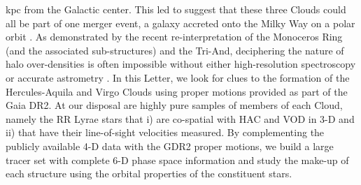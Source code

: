 \documentclass[fleqn,usenatbib]{mnras}
\begin{document}
kpc from the Galactic center. This led \citet{Li2016} to suggest that
these three Clouds could all be part of one merger event, a galaxy
accreted onto the Milky Way on a polar orbit \citep[see
  also][]{Juric2008}.
As demonstrated by the recent re-interpretation of the Monoceros Ring
(and the associated sub-structures) and the Tri-And, deciphering the
nature of halo over-densities is often impossible without either
high-resolution spectroscopy \citep[e.g.][]{Bergemann2018} or accurate
astrometry \citep[e.g.][]{deBoer2018,Deason2018}. In this Letter, we
look for clues to the formation of the Hercules-Aquila and Virgo
Clouds using proper motions provided as part of the Gaia DR2. At our
disposal are highly pure samples of members of each Cloud, namely the
RR Lyrae stars that i) are co-spatial with HAC and VOD in 3-D and ii)
that have their line-of-sight velocities measured. By complementing
the publicly available 4-D data with the GDR2 proper motions, we build
a large tracer set with complete 6-D phase space information and study
the make-up of each structure using the orbital properties of the
constituent stars.
%
\end{document}
